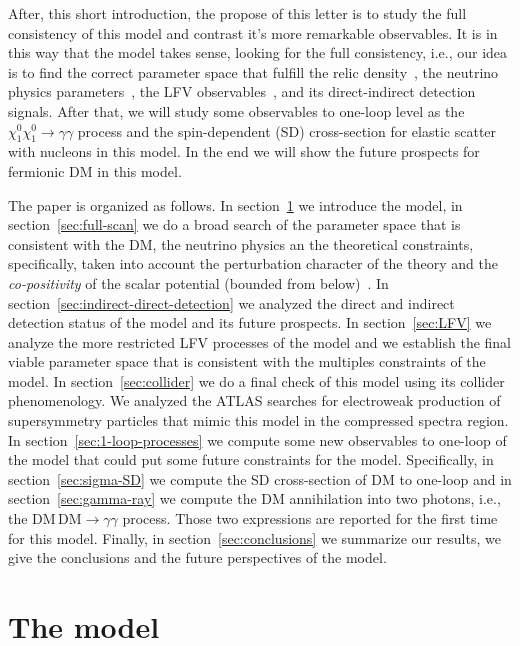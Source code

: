 \documentclass[12pt,letterpaper]{article}
\begin{document}
After, this short introduction, the propose of this letter is to study the full consistency of this model and contrast it's more remarkable observables. It is in this way that the model takes sense, looking for the full consistency, i.e., 
our idea is to find the correct parameter space that fulfill the relic density~\cite{Aghanim:2018eyx}, the neutrino physics parameters~\cite{Forero:2014bxa, deSalas:2017kay}, the LFV observables~\cite{Rocha-Moran:2016enp}, and its direct-indirect detection signals. 
After that, we will study some observables to one-loop level as the $\chi^0_1\chi^0_1\to\gamma\gamma$ process and the spin-dependent (SD) cross-section for elastic scatter with nucleons in this model.  In the end we will show the future prospects for fermionic DM in this model.

The paper is organized as follows. In section~\ref{sec:model} we introduce the model, in section~\ref{sec:full-scan} we do a broad search of the parameter space that is consistent with the DM, the neutrino physics an the theoretical constraints, specifically, taken into account the perturbation character of the theory and the \textit{co-positivity} of the scalar potential (bounded from below)~\cite{Merle:2016scw}. 
In section~\ref{sec:indirect-direct-detection} we analyzed the direct and indirect detection status of the model and its future prospects. 
In section~\ref{sec:LFV} we analyze the more restricted LFV processes of the model and we establish the final viable parameter space that is consistent with the multiples constraints of the model.
In section~\ref{sec:collider} we do a final check of this model using its collider phenomenology. We analyzed the ATLAS searches for electroweak production of supersymmetry particles that mimic this model in the compressed spectra region.
In section~\ref{sec:1-loop-processes} we compute some new observables to one-loop of the model that could put some future constraints for the model.
Specifically, in section~\ref{sec:sigma-SD} we compute the SD cross-section of DM to one-loop and in section~\ref{sec:gamma-ray} we compute the DM annihilation into two photons, i.e., the $\text{DM}\,\text{DM} \to \gamma\gamma$ process. Those two expressions are reported for the first time for this model.
Finally, in section~\ref{sec:conclusions} we summarize our results, we give the conclusions and the future perspectives of the model.



\section{The model}
\label{sec:model}
\end{document}

